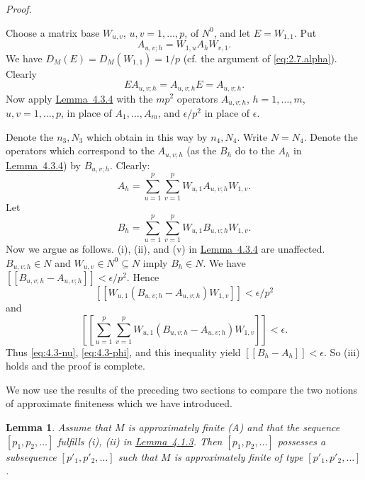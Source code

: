 \documentclass[b5paper,twoside]{article}
\newcommand{\lemref}[2]{\hyperref[#1]{\mbox{Lemma~#2}}}
\theoremstyle{mvnplain}
\newtheorem{lemma}{Lemma}[section]
\renewenvironment{proof}[1][Proof]{%
  \par\addvspace{0.35\baselineskip}%
  \noindent\textit{#1.}\ \normalfont\ignorespaces
}{%
  \par\addvspace{0.35\baselineskip}%
}
\newcommand{\M}{\mathbf M}
\newcommand{\N}{\mathbf N}
\newcommand{\Metric}[1]{\left[\!\left[#1\right]\!\right]}
\def\M{M}%
\def\N{N}%
\def\Metric#1{[[#1]]}%
\begin{document}
\begin{proof}
Choose a matrix base \(W_{u,v}\), \(u,v=1,\ldots,p\), of \(\N^0\), and let
\(E=W_{1,1}\). Put
\[
 A_{u,v;h}=W_{1,u}A_hW_{v,1}.
\]
We have \(D_{\M}(E)=D_{\M}(W_{1,1})=1/p\) (cf. the argument of
\eqref{eq:2.7.alpha}). Clearly
\[
 EA_{u,v;h}=A_{u,v;h}E=A_{u,v;h}.
\]
Now apply \lemref{lem:4.3.4}{4.3.4} with the \(mp^2\) operators
\(A_{u,v;h}\), \(h=1,\ldots,m\), \(u,v=1,\ldots,p\), in place of
\(A_1,\ldots,A_m\), and \(\epsilon/p^2\) in place of \(\epsilon\).

Denote the \(n_3,\N_3\) which obtain in this way by \(n_4,\N_4\). Write
\(\N=\N_4\). Denote the operators which correspond to the \(A_{u,v;h}\)
(as the \(B_h\) do to the \(A_h\) in \lemref{lem:4.3.4}{4.3.4}) by
\(B_{u,v;h}\). Clearly:
\begin{equation}\tag{4.3.\(\nu\)}\label{eq:4.3-nu}
 A_h=\sum_{u=1}^{p}\sum_{v=1}^{p}W_{u,1}A_{u,v;h}W_{1,v}.
\end{equation}
Let
\begin{equation}\tag{4.3.\(\phi\)}\label{eq:4.3-phi}
 B_h=\sum_{u=1}^{p}\sum_{v=1}^{p}W_{u,1}B_{u,v;h}W_{1,v}.
\end{equation}
Now we argue as follows. (i), (ii), and (v) in \lemref{lem:4.3.4}{4.3.4}
are unaffected. \(B_{u,v;h}\in\N\) and \(W_{u,v}\in\N^0\subseteq\N\)
imply \(B_h\in\N\). We have
\(\Metric{B_{u,v;h}-A_{u,v;h}}<\epsilon/p^2\). Hence
\[
 \Metric{W_{u,1}(B_{u,v;h}-A_{u,v;h})W_{1,v}}<\epsilon/p^2
\]
and
\[
 \Metric{\sum_{u=1}^{p}\sum_{v=1}^{p}
 W_{u,1}(B_{u,v;h}-A_{u,v;h})W_{1,v}}<\epsilon.
\]
Thus \eqref{eq:4.3-nu}, \eqref{eq:4.3-phi}, and this inequality yield
\(\Metric{B_h-A_h}<\epsilon\). So (iii) holds and the proof is complete.
\end{proof}

We now use the results of the preceding two sections to compare the two notions
of approximate finiteness which we have introduced.

\begin{lemma}\label{lem:4.4.1}
Assume that \(\M\) is approximately finite (A) and that the sequence
\([p_1,p_2,\ldots]\) fulfills (i), (ii) in \lemref{lem:4.1.3}{4.1.3}. Then
\([p_1,p_2,\ldots]\) possesses a subsequence
\([p'_1,p'_2,\ldots]\) such that \(\M\) is approximately finite of type
\([p'_1,p'_2,\ldots]\).
\end{lemma}
\end{document}

